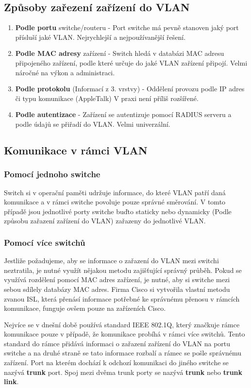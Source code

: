 \subsection{Způsoby zařezení zařízení do VLAN}
\begin{enumerate}
    \item \textbf{Podle portu} switche/routeru - Port switche má pevně stanoven jaký port přísluší jaké VLAN.
    Nejrychlejší a nejpoužívanější řešení.
    \item \textbf{Podle MAC adresy} zařízení - Switch hledá v databázi MAC adresu připojeného zařízení, podle které určuje do jaké VLAN zařízení připojí.
    Velmi náročné na výkon a administraci.
    \item \textbf{Podle protokolu} (Informací z 3. vrstvy) - Oddělení provozu podle IP adres či typu komunikace (AppleTalk)
    V praxi není příliš rozšířené.
    \item \textbf{Podle autentizace} - Zařízení se autentizuje pomocí RADIUS serveru a podle údajů se přiřadí do VLAN.
    Velmi univerzální.
\end{enumerate}
\subsection{Komunikace v rámci VLAN}
\subsubsection{Pomocí jednoho switche}
Switch si v operační paměti udržuje informace, do které VLAN patří daná komunikace a v rámci switche povoluje pouze správné směrování.
V tomto případě jsou jednotlivé porty switche buďto staticky nebo dynamicky (Podle způsobu zařazení zařízení do VLAN) zařazeny do jednotlivé VLAN.
\subsubsection{Pomocí více switchů}
Jestliže požadujeme, aby se informace o zařazení do VLAN mezi switchi neztratila, je nutné využít nějakou metodu zajišťující správný průběh.
Pokud se využívá rozdělení pomocí MAC adres zařízení, je nutné, aby si switche mezi sebou sdílely databázy MAC adres.
Firma Cisco si vytvořila vlastní metodu zvanou ISL, která přenásí informace potřebné ke správnému přenosu v rámcích komunikace, funguje ovšem pouze na zařízeních Cisco.

Nejvíce se v dnešní době používá standard IEEE 802.1Q, který značkuje rámce komunikace pouze v případě, že komunikace probíhá v rámci více switchů.
Tento standard do rámce přidává informaci o zařazení zařízení do VLAN na portu switche a na druhé straně se tato informace rozbalí a rámec se pošle správnému zařízení.
Port na kterém dochází k odchozí komunikaci do jiného switche se nazývá \textbf{trunk} port.
Spoj mezi dvěma trunk porty se nazývá \textbf{trunk} nebo \textbf{trunk link}.
